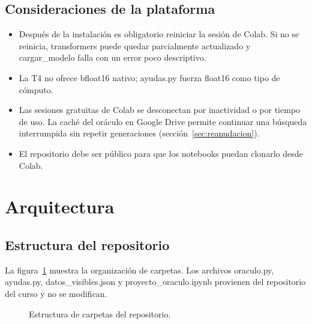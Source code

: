 \documentclass[12pt,letterpaper]{article}
\theoremstyle{definition}
\begin{document}
\subsection{Consideraciones de la plataforma}
\begin{itemize}[leftmargin=*]
\item Después de la instalación es obligatorio reiniciar la sesión de Colab. Si no se reinicia, transformers puede quedar parcialmente actualizado y cargar\_modelo falla con un error poco descriptivo.
\item La T4 no ofrece bfloat16 nativo; ayudas.py fuerza float16 como tipo de cómputo.
\item Las sesiones gratuitas de Colab se desconectan por inactividad o por tiempo de uso. La caché del oráculo en Google Drive permite continuar una búsqueda interrumpida sin repetir generaciones (sección~\ref{sec:reanudacion}).
\item El repositorio debe ser público para que los notebooks puedan clonarlo desde Colab.
\end{itemize}

\section{Arquitectura}

\subsection{Estructura del repositorio}
La figura~\ref{fig:arbol} muestra la organización de carpetas. Los archivos oraculo.py, ayudas.py, datos\_visibles.json y proyecto\_oraculo.ipynb provienen del repositorio del curso y no se modifican.

\begin{figure}[H]
\begin{singlespace}
\end{singlespace}
\caption{Estructura de carpetas del repositorio.}\label{fig:arbol}
\end{figure}
\end{document}
